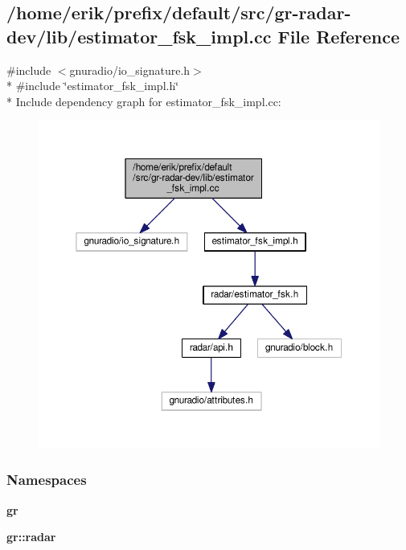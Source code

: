 \subsection{/home/erik/prefix/default/src/gr-\/radar-\/dev/lib/estimator\+\_\+fsk\+\_\+impl.cc File Reference}
\label{estimator__fsk__impl_8cc}
{\ttfamily \#include $<$gnuradio/io\+\_\+signature.\+h$>$}\\*
{\ttfamily \#include \char`\"{}estimator\+\_\+fsk\+\_\+impl.\+h\char`\"{}}\\*
Include dependency graph for estimator\+\_\+fsk\+\_\+impl.\+cc\+:
\nopagebreak
\begin{figure}[H]
\begin{center}
\leavevmode
\includegraphics[width=350pt]{d4/db2/estimator__fsk__impl_8cc__incl}
\end{center}
\end{figure}
\subsubsection*{Namespaces}
\begin{DoxyCompactItemize}
\item 
 {\bf gr}
\item 
 {\bf gr\+::radar}
\end{DoxyCompactItemize}
